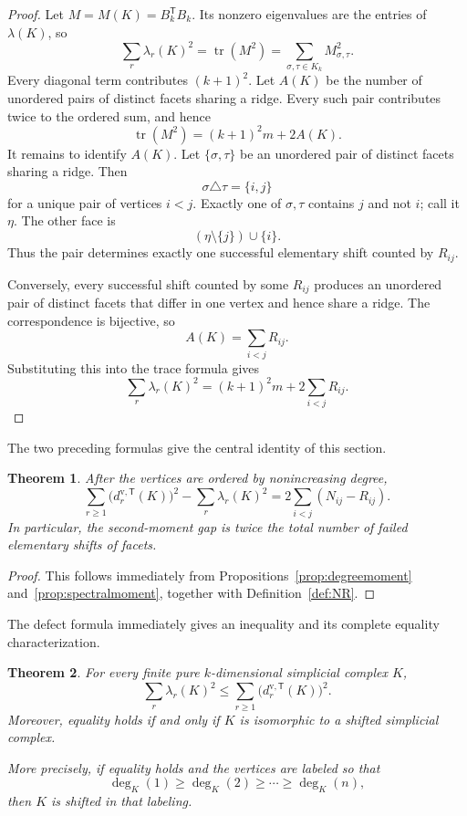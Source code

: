 \documentclass[11pt,reqno]{amsart}
\numberwithin{equation}{section}
\theoremstyle{plain}
\newtheorem{theorem}{Theorem}[section]
\theoremstyle{definition}
\newcommand{\T}{\mathsf{T}}
\DeclareMathOperator{\tr}{tr}
\begin{document}
\begin{proof}
Let $M=M(K)=B_k^{\T}B_k$. Its nonzero eigenvalues are the entries of $\lambda(K)$, so
\[
\sum_r \lambda_r(K)^2
=\tr(M^2)
=\sum_{\sigma,\tau\in K_k}M_{\sigma,\tau}^2.
\]
Every diagonal term contributes $(k+1)^2$. Let $A(K)$ be the number of unordered pairs of
distinct facets sharing a ridge. Every such pair contributes twice to the ordered sum, and hence
\[
\tr(M^2)=(k+1)^2m+2A(K).
\]
It remains to identify $A(K)$. Let $\{\sigma,\tau\}$ be an unordered pair of distinct facets
sharing a ridge. Then
\[
\sigma\triangle\tau=\{i,j\}
\]
for a unique pair of vertices $i<j$. Exactly one of $\sigma,\tau$ contains $j$ and not $i$; call it $\eta$. The other face is
\[
(\eta\setminus\{j\})\cup\{i\}.
\]
Thus the pair determines exactly one successful elementary shift counted by $R_{ij}$.

Conversely, every successful shift counted by some $R_{ij}$ produces an unordered pair of
distinct facets that differ in one vertex and hence share a ridge. The correspondence is
bijective, so
\[
A(K)=\sum_{i<j}R_{ij}.
\]
Substituting this into the trace formula gives
\[
\sum_r \lambda_r(K)^2
=(k+1)^2m+2\sum_{i<j}R_{ij}.
\]
\end{proof}

The two preceding formulas give the central identity of this section.

\begin{theorem}\label{thm:defect}
After the vertices are ordered by nonincreasing degree,
\[
\sum_{r\ge1}\bigl(d^{\mathrm v,\T}_r(K)\bigr)^2
-\sum_r \lambda_r(K)^2
=2\sum_{i<j}(N_{ij}-R_{ij}).
\]
In particular, the second-moment gap is twice the total number of failed elementary shifts of
facets.
\end{theorem}

\begin{proof}
This follows immediately from Propositions~\ref{prop:degreemoment}
and~\ref{prop:spectralmoment}, together with Definition~\ref{def:NR}.
\end{proof}

The defect formula immediately gives an inequality and its complete equality characterization.

\begin{theorem}\label{thm:momentcharacterization}
For every finite pure $k$-dimensional simplicial complex $K$,
\[
\sum_r \lambda_r(K)^2
\le
\sum_{r\ge1}\bigl(d^{\mathrm v,\T}_r(K)\bigr)^2.
\]
Moreover, equality holds if and only if $K$ is isomorphic to a shifted simplicial complex.

More precisely, if equality holds and the vertices are labeled so that
\[
\deg_K(1)\ge\deg_K(2)\ge\cdots\ge\deg_K(n),
\]
then $K$ is shifted in that labeling.
\end{theorem}
\end{document}
